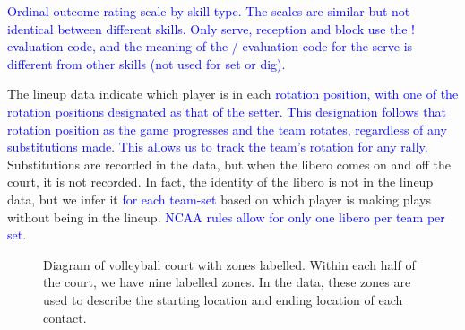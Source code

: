 \documentclass[USenglish]{article}
\theoremstyle{dgthm}
\theoremstyle{dgdef}
\begin{document}
\begin{table}
    \centering
    \color{blue}
    
    \caption{\textcolor{blue}{Ordinal outcome rating scale by skill type. The scales are similar but not identical between different skills. Only serve, reception and block use the ! evaluation code, and the meaning of the / evaluation code for the serve is different from other skills (not used for set or dig).}}
    \label{tab:evaluation-codes}
\end{table}

The lineup data indicate which player is in each \textcolor{blue}{rotation position, with one of the rotation positions designated as that of the setter. This designation follows that rotation position as the game progresses and the team rotates, regardless of any substitutions made. This allows us to track the team's rotation for any rally.} Substitutions are recorded in the data, but when the libero comes on and off the court, it is not recorded. In fact, the identity of the libero is not in the lineup data, but we infer it \textcolor{blue}{for each team-set} based on which player is making plays without being in the lineup. \textcolor{blue}{NCAA rules allow for only one libero per team per set}.

\begin{figure}
    \centering
    \caption{Diagram of volleyball court with zones labelled. Within each half of the court, we have nine labelled zones. In the data, these zones are used to describe the starting location and ending location of each contact.}
    \label{fig:volleyball-court-diagram}
\end{figure}
\end{document}
